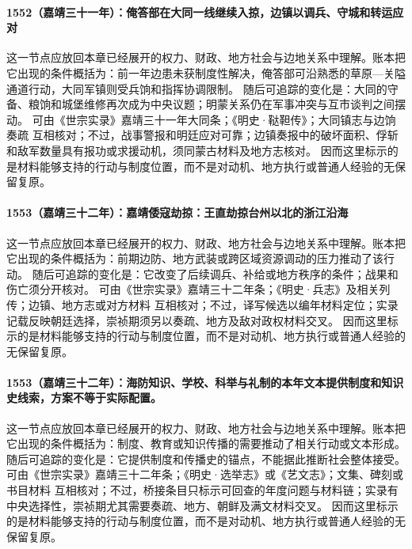 \paragraph{1552（嘉靖三十一年）：俺答部在大同一线继续入掠，边镇以调兵、守城和转运应对} 这一节点应放回本章已经展开的权力、财政、地方社会与边地关系中理解。账本把它出现的条件概括为：前一年边患未获制度性解决，俺答部可沿熟悉的草原—关隘通道行动，大同军镇则受兵饷和指挥协调限制。 随后可追踪的变化是：大同的守备、粮饷和城堡维修再次成为中央议题；明蒙关系仍在军事冲突与互市谈判之间摆动。 可由《世宗实录》嘉靖三十一年大同条；《明史·鞑靼传》；大同镇志与边饷奏疏 互相核对；不过，战事警报和明廷应对可靠；边镇奏报中的破坏面积、俘斩和敌军数量具有报功或求援动机，须同蒙古材料及地方志核对。 因而这里标示的是材料能够支持的行动与制度位置，而不是对动机、地方执行或普通人经验的无保留复原。

\paragraph{1553（嘉靖三十二年）：嘉靖倭寇劫掠：王直劫掠台州以北的浙江沿海} 这一节点应放回本章已经展开的权力、财政、地方社会与边地关系中理解。账本把它出现的条件概括为：前期边防、地方武装或跨区域资源调动的压力推动了该行动。 随后可追踪的变化是：它改变了后续调兵、补给或地方秩序的条件；战果和伤亡须分开核对。 可由《世宗实录》嘉靖三十二年条；《明史·兵志》及相关列传；边镇、地方志或对方材料 互相核对；不过，译写候选以编年材料定位；实录记载反映朝廷选择，崇祯期须另以奏疏、地方及敌对政权材料交叉。 因而这里标示的是材料能够支持的行动与制度位置，而不是对动机、地方执行或普通人经验的无保留复原。

\paragraph{1553（嘉靖三十二年）：海防知识、学校、科举与礼制的本年文本提供制度和知识史线索，方案不等于实际配置。} 这一节点应放回本章已经展开的权力、财政、地方社会与边地关系中理解。账本把它出现的条件概括为：制度、教育或知识传播的需要推动了相关行动或文本形成。 随后可追踪的变化是：它提供制度和传播史的锚点，不能据此推断社会整体接受。 可由《世宗实录》嘉靖三十二年条；《明史·选举志》或《艺文志》；文集、碑刻或书目材料 互相核对；不过，桥接条目只标示可回查的年度问题与材料链；实录有中央选择性，崇祯期尤其需要奏疏、地方、朝鲜及满文材料交叉。 因而这里标示的是材料能够支持的行动与制度位置，而不是对动机、地方执行或普通人经验的无保留复原。


